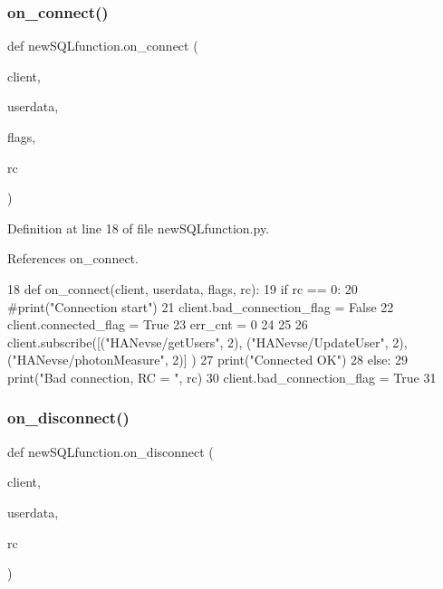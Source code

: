 \subsubsection{on\+\_\+connect()}
{\footnotesize\ttfamily def new\+S\+Q\+Lfunction.\+on\+\_\+connect (\begin{DoxyParamCaption}\item[{}]{client,  }\item[{}]{userdata,  }\item[{}]{flags,  }\item[{}]{rc }\end{DoxyParamCaption})}



Definition at line 18 of file new\+S\+Q\+Lfunction.\+py.



References on\+\_\+connect.


\begin{DoxyCode}
18 \textcolor{keyword}{def }on_connect(client, userdata, flags, rc):
19     \textcolor{keywordflow}{if} rc == 0:
20         \textcolor{comment}{#print("Connection start")}
21         client.bad\_connection\_flag = \textcolor{keyword}{False}
22         client.connected\_flag = \textcolor{keyword}{True}
23         err\_cnt = 0
24 
25 
26         client.subscribe([(\textcolor{stringliteral}{"HANevse/getUsers"}, 2), (\textcolor{stringliteral}{"HANevse/UpdateUser"}, 2), (\textcolor{stringliteral}{"HANevse/photonMeasure"}, 2)]
      )
27         print(\textcolor{stringliteral}{"Connected OK"})
28     \textcolor{keywordflow}{else}:
29         print(\textcolor{stringliteral}{"Bad connection, RC = "}, rc)
30         client.bad\_connection\_flag = \textcolor{keyword}{True}
31         
\end{DoxyCode}
\mbox{\label{namespacenew_s_q_lfunction_ad73cc775d0991d270d805d09414bd2f0}} 
\subsubsection{on\+\_\+disconnect()}
{\footnotesize\ttfamily def new\+S\+Q\+Lfunction.\+on\+\_\+disconnect (\begin{DoxyParamCaption}\item[{}]{client,  }\item[{}]{userdata,  }\item[{}]{rc }\end{DoxyParamCaption})}



